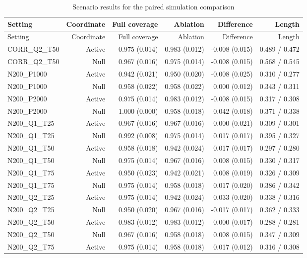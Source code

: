 \begin{longtable}{lrrrrr}
\caption{Scenario results for the paired simulation comparison}\label{tab:joint-simulation-all}\\
\toprule
Setting & Coordinate & Full coverage & Ablation & Difference & Length \\
\midrule\endfirsthead
\toprule
Setting & Coordinate & Full coverage & Ablation & Difference & Length \\
\midrule\endhead
CORR\_Q2\_T50 & Active & 0.975 (0.014) & 0.983 (0.012) & -0.008 (0.015) & 0.489 / 0.472 \\
CORR\_Q2\_T50 & Null & 0.967 (0.016) & 0.975 (0.014) & -0.008 (0.015) & 0.568 / 0.545 \\
N200\_P1000 & Active & 0.942 (0.021) & 0.950 (0.020) & -0.008 (0.025) & 0.310 / 0.277 \\
N200\_P1000 & Null & 0.958 (0.022) & 0.958 (0.022) & 0.000 (0.012) & 0.343 / 0.311 \\
N200\_P2000 & Active & 0.975 (0.014) & 0.983 (0.012) & -0.008 (0.015) & 0.317 / 0.308 \\
N200\_P2000 & Null & 1.000 (0.000) & 0.958 (0.018) & 0.042 (0.018) & 0.371 / 0.338 \\
N200\_Q1\_T25 & Active & 0.967 (0.016) & 0.967 (0.016) & 0.000 (0.021) & 0.309 / 0.301 \\
N200\_Q1\_T25 & Null & 0.992 (0.008) & 0.975 (0.014) & 0.017 (0.017) & 0.395 / 0.327 \\
N200\_Q1\_T50 & Active & 0.958 (0.018) & 0.942 (0.024) & 0.017 (0.017) & 0.297 / 0.280 \\
N200\_Q1\_T50 & Null & 0.975 (0.014) & 0.967 (0.016) & 0.008 (0.015) & 0.330 / 0.317 \\
N200\_Q1\_T75 & Active & 0.950 (0.023) & 0.942 (0.021) & 0.008 (0.019) & 0.326 / 0.309 \\
N200\_Q1\_T75 & Null & 0.975 (0.014) & 0.958 (0.018) & 0.017 (0.020) & 0.386 / 0.342 \\
N200\_Q2\_T25 & Active & 0.975 (0.014) & 0.942 (0.024) & 0.033 (0.020) & 0.338 / 0.316 \\
N200\_Q2\_T25 & Null & 0.950 (0.020) & 0.967 (0.016) & -0.017 (0.017) & 0.362 / 0.333 \\
N200\_Q2\_T50 & Active & 0.983 (0.012) & 0.983 (0.012) & 0.000 (0.017) & 0.288 / 0.281 \\
N200\_Q2\_T50 & Null & 0.967 (0.016) & 0.958 (0.018) & 0.008 (0.015) & 0.347 / 0.309 \\
N200\_Q2\_T75 & Active & 0.975 (0.014) & 0.958 (0.018) & 0.017 (0.012) & 0.316 / 0.308 \\

\end{longtable}
